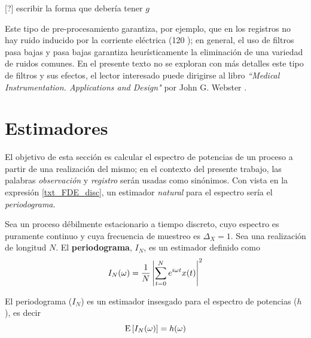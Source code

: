 [?] escribir la forma que debería tener $g$


%
Este tipo de pre-procesamiento garantiza, por ejemplo, que en los registros no hay ruido inducido por la corriente eléctrica (120 \hz); en general, el uso de filtros pasa bajas y pasa bajas garantiza heurísticamente la eliminación de una variedad de ruidos comunes.
%
En el presente texto no se exploran con más detalles este tipo de filtros y sus efectos, el lector interesado puede dirigirse al libro \textit{``Medical {I}nstrumentation. {A}pplications and {D}esign"} por John G. Webster \cite{Webster}.


\section{Estimadores}
\label{sec:estimadores}

El objetivo de esta sección es calcular el espectro de potencias de un proceso a partir de una realización del mismo; en el contexto del presente trabajo, las palabras \textit{observación} y \textit{registro} serán usadas como sinónimos.
%
Con vista en la expresión \ref{txt_FDE_disc}, un estimador \textit{natural} para el espectro sería el \textit{periodograma}.

\begin{definicion}
Sea \xt un proceso débilmente estacionario a tiempo discreto, cuyo espectro es puramente continuo y cuya frecuencia de muestreo es $\Delta_X=1$. Sea \xtd una realización de longitud $N$. 
%
El \textbf{periodograma}, $I_N$, es un estimador 
definido como
\begin{equation}
I_N(\omega) = \frac{1}{N} \left| \sum_{t = 0}^{N} e^{i \omega t} x(t) \right|^{2}
\end{equation}
\label{txt_periodograma}
\end{definicion}

\begin{proposicion}
El periodograma ($I_N$) es un estimador insesgado para el espectro de potencias ($h$), es decir
\begin{equation}
\mathrm{E}\left[ I_N(\omega) \right] = h(\omega)
\end{equation}
\end{proposicion}

